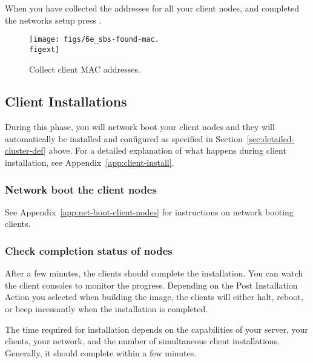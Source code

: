 When you have collected the addresses for all your client nodes, and
completed the networks setup press .

\begin{figure}[htbp]
  \begin{center}
    \texttt{[image: figs/6e\_sbs-found-mac.\\figext]}
    \caption{Collect client MAC addresses.}
    \label{fig:detailed-collect-mac}
  \end{center}
\end{figure}


\subsection{Client Installations}
\label{det:clientinstall}

During this phase, you will network boot your client nodes and they
will automatically be installed and configured as specified in
Section~\ref{sec:detailed-cluster-def} above. For a detailed
explanation of what happens during client installation, see
Appendix~\ref{app:client-install}.


\subsubsection{Network boot the client nodes}

See Appendix~\ref{app:net-boot-client-nodes} for instructions on
network booting clients.


\subsubsection{Check completion status of nodes}
\label{det:clientfinish}

After a few minutes, the clients should complete the installation.
You can watch the client consoles to monitor the progress. Depending
on the Post Installation Action you selected when building the image,
the clients will either halt, reboot, or beep incessantly when the
installation is completed.

The time required for installation depends on the capabilities of your
server, your clients, your network, and the number of simultaneous
client installations.  Generally, it should complete within a few
minutes.
  
